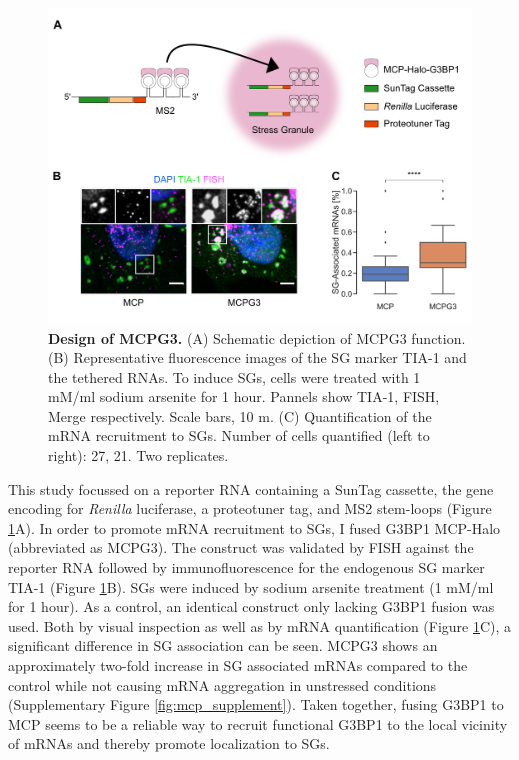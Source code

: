\begin{figure}[b!]
    \centering
    \includegraphics[width=\linewidth]{images/figure2}
    \caption{\textbf{Design of MCPG3.}
        (A) Schematic depiction of MCPG3 function.
        (B) Representative fluorescence images of the SG marker
            TIA-1 and the tethered RNAs.
            To induce SGs, cells were treated with 1 mM/ml sodium arsenite for 1 hour.
            Pannels show TIA-1, FISH, Merge respectively.
            Scale bars, 10 \textmu m.
        (C) Quantification of the mRNA recruitment to SGs.
            Number of cells quantified (left to right): 27, 21. Two replicates.
    }
    \label{fig:mcp_images}
\end{figure}

This study focussed on a reporter RNA containing a SunTag cassette, the gene encoding for \textit{Renilla} luciferase, a proteotuner tag, and MS2 stem-loops (Figure \ref{fig:mcp_images}A).
In order to promote mRNA recruitment to SGs, I fused G3BP1 MCP-Halo (abbreviated as MCPG3).
The construct was validated by FISH against the reporter RNA followed by immunofluorescence for the endogenous SG marker TIA-1 \cite{kedersha_rna-binding_1999} (Figure \ref{fig:mcp_images}B).
SGs were induced by sodium arsenite treatment (1 mM/ml for 1 hour).
As a control, an identical construct only lacking G3BP1 fusion was used.
Both by visual inspection as well as by mRNA quantification (Figure \ref{fig:mcp_images}C), a significant difference in SG association can be seen.
MCPG3 shows an approximately two-fold increase in SG associated mRNAs compared to the control while not causing mRNA aggregation in unstressed conditions (Supplementary Figure \ref{fig:mcp_supplement}).
Taken together, fusing G3BP1 to MCP seems to be a reliable way to recruit functional G3BP1 to the local vicinity of mRNAs and thereby promote localization to SGs.


